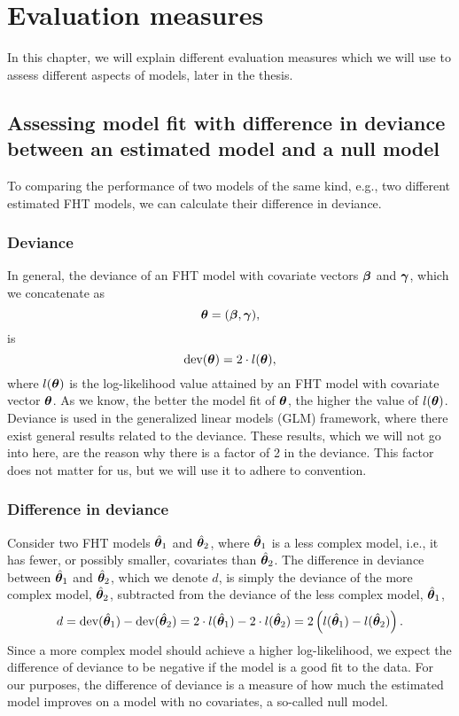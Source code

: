 \chapter{Evaluation measures}
In this chapter, we will explain different evaluation measures which we will use to assess different aspects of models, later in the thesis.

\section{Assessing model fit with difference in deviance between an estimated model and a null model}
\label{sec:deviance}
To comparing the performance of two models of the same kind, e.g., two different estimated FHT models, we can calculate their difference in deviance.

\subsection{Deviance}
In general, the deviance of an FHT model with covariate vectors $\boldsymbol{\beta}$ and $\boldsymbol{\gamma}$, which we concatenate as
\begin{equation*}
    \boldsymbol{\theta}=(\boldsymbol{\beta},\boldsymbol{\gamma}),
\end{equation*}
is
\begin{equation*}
    \text{dev}(\boldsymbol{\theta})=2\cdot l(\boldsymbol{\theta}),
\end{equation*}
where $l(\boldsymbol{\theta})$ is the log-likelihood value attained by an FHT model with covariate vector $\boldsymbol{\theta}$.
As we know, the better the model fit of $\boldsymbol{\theta}$, the higher the value of $l(\boldsymbol{\theta})$.
Deviance is used in the generalized linear models (GLM) framework, where there exist general results related to the deviance.
These results, which we will not go into here, are the reason why there is a factor of 2 in the deviance.
This factor does not matter for us, but we will use it to adhere to convention.

\subsection{Difference in deviance}
Consider two FHT models $\hat{\boldsymbol{\theta}}_1$ and $\hat{\boldsymbol{\theta}}_2$, where $\hat{\boldsymbol{\theta}}_1$ is a less complex model, i.e., it has fewer, or possibly smaller, covariates than $\hat{\boldsymbol{\theta}}_2$.
The difference in deviance between $\hat{\boldsymbol{\theta}}_1$ and $\hat{\boldsymbol{\theta}}_2$, which we denote $d$, is simply the deviance of the more complex model, $\hat{\boldsymbol{\theta}}_2$, subtracted from the deviance of the less complex model, $\hat{\boldsymbol{\theta}}_1$,
\begin{equation*}
    d=\text{dev}(\hat{\boldsymbol{\theta}}_1)-\text{dev}(\hat{\boldsymbol{\theta}}_2)=2\cdot l(\hat{\boldsymbol{\theta}}_1)-2\cdot l(\hat{\boldsymbol{\theta}}_2)=2\left(l(\hat{\boldsymbol{\theta}}_1)-l(\hat{\boldsymbol{\theta}}_2)\right).
\end{equation*}
Since a more complex model should achieve a higher log-likelihood, we expect the difference of deviance to be negative if the model is a good fit to the data.
For our purposes, the difference of deviance is a measure of how much the estimated model improves on a model with no covariates, a so-called null model.

